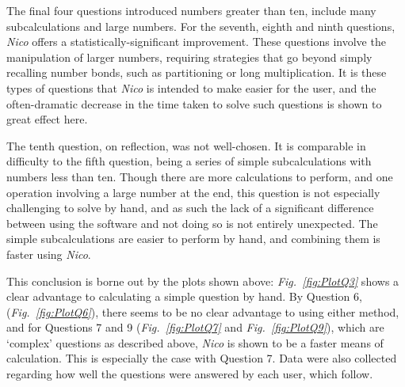 \documentclass[12pt,twoside,notitlepage,xetex]{report}
\begin{document}
{The final four questions introduced numbers greater than ten, include many subcalculations and large numbers.  For the seventh, eighth and ninth questions, \emph{Nico} offers a statistically-significant improvement.  These questions involve the manipulation of larger numbers, requiring strategies that go beyond simply recalling number bonds, such as partitioning or long multiplication.  It is these types of questions that \emph{Nico} is intended to make easier for the user, and the often-dramatic decrease in the time taken to solve such questions is shown to great effect here.

The tenth question, on reflection, was not well-chosen.  It is comparable in difficulty to the fifth question, being a series of simple subcalculations with numbers less than ten.  Though there are more calculations to perform, and one operation involving a large number at the end,  this question is not especially challenging to solve by hand, and as such the lack of a significant difference between using the software and not doing so is not entirely unexpected.  The simple subcalculations are easier to perform by hand, and combining them is faster using \emph{Nico}.

This conclusion is borne out by the plots shown above: \emph{Fig.~\ref{fig:PlotQ3}} shows a clear advantage to calculating a simple question by hand.  By Question 6, (\emph{Fig.~\ref{fig:PlotQ6}}), there seems to be no clear advantage to using either method, and for Questions 7 and 9 (\emph{Fig.~\ref{fig:PlotQ7}} and \emph{Fig.~\ref{fig:PlotQ9}}), which are `complex' questions as described above, \emph{Nico} is shown to be a faster means of calculation.  This is especially the case with Question 7.  Data were also collected regarding how well the questions were answered by each user, which follow.

}
\end{document}
